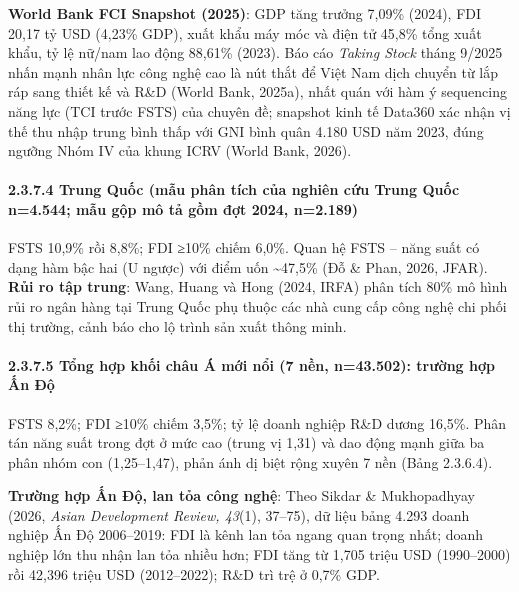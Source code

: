 \documentclass[
  a4paper,
  13pt]{extreport}
\begin{document}
\textbf{World Bank FCI Snapshot (2025)}: GDP tăng trưởng 7,09\% (2024),
FDI 20,17 tỷ USD (4,23\% GDP), xuất khẩu máy móc và điện tử 45,8\% tổng
xuất khẩu, tỷ lệ nữ/nam lao động 88,61\% (2023). Báo cáo \emph{Taking
Stock} tháng 9/2025 nhấn mạnh nhân lực công nghệ cao là nút thắt để Việt
Nam dịch chuyển từ lắp ráp sang thiết kế và R\&D (World Bank, 2025a),
nhất quán với hàm ý sequencing năng lực (TCI trước FSTS) của chuyên đề;
snapshot kinh tế Data360 xác nhận vị thế thu nhập trung bình thấp với
GNI bình quân 4.180 USD năm 2023, đúng ngưỡng Nhóm IV của khung ICRV
(World Bank, 2026).

\hypertarget{trung-quux1ed1c-mux1eabu-phuxe2n-tuxedch-cux1ee7a-nghiuxean-cux1ee9u-trung-quux1ed1c-n4.544-mux1eabu-gux1ed9p-muxf4-tux1ea3-gux1ed3m-ux111ux1ee3t-2024-n2.189}{%
\paragraph{2.3.7.4 Trung Quốc (mẫu phân tích của nghiên cứu Trung Quốc
n=4.544; mẫu gộp mô tả gồm đợt 2024,
n=2.189)}\label{trung-quux1ed1c-mux1eabu-phuxe2n-tuxedch-cux1ee7a-nghiuxean-cux1ee9u-trung-quux1ed1c-n4.544-mux1eabu-gux1ed9p-muxf4-tux1ea3-gux1ed3m-ux111ux1ee3t-2024-n2.189}}

FSTS 10,9\% rồi 8,8\%; FDI ≥10\% chiếm 6,0\%. Quan hệ FSTS -- năng suất
có dạng hàm bậc hai (U ngược) với điểm uốn \textasciitilde47,5\% (Đỗ \&
Phan, 2026, JFAR). \textbf{Rủi ro tập trung}: Wang, Huang và Hong (2024,
IRFA) phân tích 80\% mô hình rủi ro ngân hàng tại Trung Quốc phụ thuộc
các nhà cung cấp công nghệ chi phối thị trường, cảnh báo cho lộ trình
sản xuất thông minh.

\hypertarget{tux1ed5ng-hux1ee3p-khux1ed1i-chuxe2u-uxe1-mux1edbi-nux1ed5i-7-nux1ec1n-n43.502-trux1b0ux1eddng-hux1ee3p-ux1ea5n-ux111ux1ed9}{%
\paragraph{2.3.7.5 Tổng hợp khối châu Á mới nổi (7 nền, n=43.502):
trường hợp Ấn
Độ}\label{tux1ed5ng-hux1ee3p-khux1ed1i-chuxe2u-uxe1-mux1edbi-nux1ed5i-7-nux1ec1n-n43.502-trux1b0ux1eddng-hux1ee3p-ux1ea5n-ux111ux1ed9}}

FSTS 8,2\%; FDI ≥10\% chiếm 3,5\%; tỷ lệ doanh nghiệp R\&D dương 16,5\%.
Phân tán năng suất trong đợt ở mức cao (trung vị 1,31) và dao động mạnh
giữa ba phân nhóm con (1,25--1,47), phản ánh dị biệt rộng xuyên 7 nền
(Bảng 2.3.6.4).

\textbf{Trường hợp Ấn Độ, lan tỏa công nghệ}: Theo Sikdar \&
Mukhopadhyay (2026, \emph{Asian Development Review, 43}(1), 37--75), dữ
liệu bảng 4.293 doanh nghiệp Ấn Độ 2006--2019: FDI là kênh lan tỏa ngang
quan trọng nhất; doanh nghiệp lớn thu nhận lan tỏa nhiều hơn; FDI tăng
từ 1,705 triệu USD (1990--2000) rồi 42,396 triệu USD (2012--2022); R\&D
trì trệ ở 0,7\% GDP.
\end{document}
